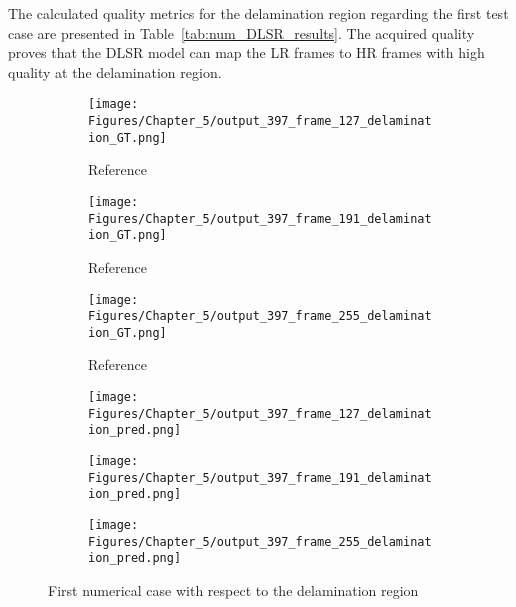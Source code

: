 The calculated quality metrics for the delamination region regarding the first test case are presented in Table~\ref{tab:num_DLSR_results}.
The acquired quality proves that the DLSR model can map the LR frames to HR frames with high quality at the delamination region.

\begin{figure} [!ht]
	\centering
	\begin{subfigure}[b]{.32\textwidth}
		\centering
		\texttt{[image: Figures/Chapter\_5/output\_397\_frame\_127\_delamination\_GT.png]}
		\caption{Reference}
		\label{fig:ref_397_damage_127}
	\end{subfigure}
	\begin{subfigure}[b]{.32\textwidth}
		\centering
		\texttt{[image: Figures/Chapter\_5/output\_397\_frame\_191\_delamination\_GT.png]}
		\caption{Reference}
		\label{fig:ref_397_damage_191}
	\end{subfigure}
	\begin{subfigure}[b]{.32\textwidth}
		\centering
		\texttt{[image: Figures/Chapter\_5/output\_397\_frame\_255\_delamination\_GT.png]}
		\caption{Reference}
		\label{fig:ref_397_damage_255}	
	\end{subfigure}
	\begin{subfigure}[b]{.32\textwidth}
		\centering
		\texttt{[image: Figures/Chapter\_5/output\_397\_frame\_127\_delamination\_pred.png]}
		\caption{}
		\label{fig:pred_397_damage_127}
	\end{subfigure}
	\begin{subfigure}[b]{.32\textwidth}
		\centering
		\texttt{[image: Figures/Chapter\_5/output\_397\_frame\_191\_delamination\_pred.png]}
		\caption{}
		\label{fig:pred_397_damage_191}
	\end{subfigure}
	\begin{subfigure}[b]{.32\textwidth}
		\centering
		\texttt{[image: Figures/Chapter\_5/output\_397\_frame\_255\_delamination\_pred.png]}
		\caption{}
		\label{fig:pred_397_damage_255}	
	\end{subfigure}
	\caption{First numerical case with respect to the delamination region}
	\label{fig:num_results_CS_damage_area_397}
\end{figure}


